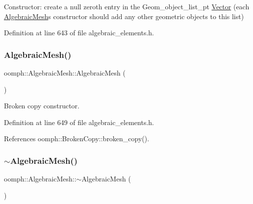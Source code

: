 Constructor\+: create a null zeroth entry in the Geom\+\_\+object\+\_\+list\+\_\+pt \hyperlink{classoomph_1_1Vector}{Vector} (each \hyperlink{classoomph_1_1AlgebraicMesh}{Algebraic\+Mesh}\textquotesingle{}s constructor should add any other geometric objects to this list) 

Definition at line 643 of file algebraic\+\_\+elements.\+h.

\mbox{\label{classoomph_1_1AlgebraicMesh_a83aeb848d30991ccb959c553769e00e3}} 
\subsubsection{\texorpdfstring{Algebraic\+Mesh()}{AlgebraicMesh()}\hspace{0.1cm}{\footnotesize\ttfamily [2/2]}}
{\footnotesize\ttfamily oomph\+::\+Algebraic\+Mesh\+::\+Algebraic\+Mesh (\begin{DoxyParamCaption}\item[{const \hyperlink{classoomph_1_1AlgebraicMesh}{Algebraic\+Mesh} \&}]{ }\end{DoxyParamCaption})\hspace{0.3cm}{\ttfamily [inline]}}



Broken copy constructor. 



Definition at line 649 of file algebraic\+\_\+elements.\+h.



References oomph\+::\+Broken\+Copy\+::broken\+\_\+copy().

\mbox{\label{classoomph_1_1AlgebraicMesh_a148dc4078a5fa2cc9ae651003e3a14ca}} 
\subsubsection{\texorpdfstring{$\sim$\+Algebraic\+Mesh()}{~AlgebraicMesh()}}
{\footnotesize\ttfamily oomph\+::\+Algebraic\+Mesh\+::$\sim$\+Algebraic\+Mesh (\begin{DoxyParamCaption}{ }\end{DoxyParamCaption})\hspace{0.3cm}{\ttfamily [inline]}}



